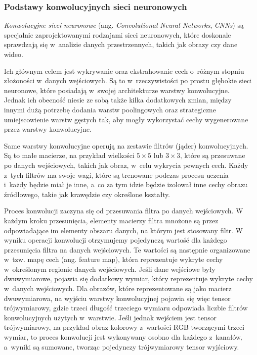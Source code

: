 {\subsubsection{Podstawy konwolucyjnych sieci neuronowych}

\emph{Konwolucyjne sieci neuronowe} (ang. \emph{Convolutional Neural Networks}, \emph{CNNs}) są specjalnie zaprojektowanymi rodzajami sieci neuronowych, które doskonale sprawdzają się w~analizie danych przestrzennych, takich jak obrazy czy dane wideo.

Ich głównym celem jest wykrywanie oraz ekstrahowanie cech o~różnym stopniu złożoności w~danych wejściowych.
Są to w~rzeczywistości po prostu głębokie sieci neuronowe, które posiadają w~swojej architekturze warstwy konwolucyjne.
Jednak ich obecność niesie ze sobą także kilka dodatkowych zmian, między innymi dużą potrzebę dodania warstw poolingowych oraz strategiczne umiejscowienie warstw gęstych tak, aby mogły wykorzystać cechy wygenerowane przez warstwy konwolucyjne.

Same warstwy konwolucyjne operują na zestawie filtrów (jąder) konwolucyjnych.
Są to małe macierze, na przykład wielkości $5 \times 5$ lub $3 \times 3$, które są przesuwane po danych wejściowych, takich jak obraz, w~celu wykrycia pewnych cech.
Każdy z~tych filtrów ma swoje wagi, które są trenowane podczas procesu uczenia i~każdy będzie miał je inne, a~co za tym idzie będzie izolował inne cechy obrazu źródłowego, takie jak krawędzie czy określone kształty.

Proces konwolucji zaczyna się od przesuwania filtra po danych wejściowych.
W każdym kroku przesunięcia, elementy macierzy filtra mnożone są przez odpowiadające im elementy obszaru danych, na którym jest stosowany filtr.
W wyniku operacji konwolucji otrzymujemy pojedynczą wartość dla każdego przesunięcia filtra na danych wejściowych.
Te wartości są następnie organizowane w~tzw. mapę cech (ang. feature map), która reprezentuje wykryte cechy w~określonym regionie danych wejściowych.
Jeśli dane wejściowe były dwuwymiarowe, pojawia się dodatkowy wymiar, który reprezentuje wykryte cechy w~danych wejściowych.
Dla obrazów, które reprezentowane są jako macierz dwuwymiarowa, na wyjściu warstwy konwolucyjnej pojawia się więc tensor trójwymiarowy, gdzie trzeci długość trzeciego wymiaru odpowiada liczbie filtrów konwolucyjnych użytych w~warstwie.
Jeśli jednak wejściem jest tensor trójwymiarowy, na przykład obraz kolorowy z~wartości RGB tworzącymi trzeci wymiar, to proces konwolucji jest wykonywany osobno dla każdego z~kanałów, a~wyniki są sumowane, tworząc pojedynczy trójwymiarowy tensor wyjściowy.

}
